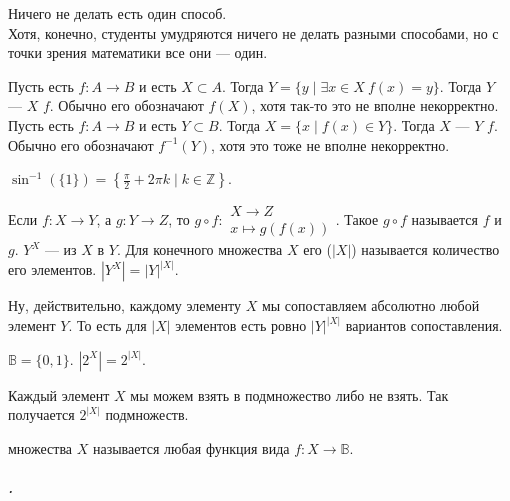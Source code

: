 \documentclass{article}
\begin{document}
\begin{itemize}
        \begin{Comment}
            Ничего не делать есть один способ.\\
            Хотя, конечно, студенты умудряются ничего не делать разными способами, но с точки зрения математики все они --- один.
        \end{Comment}
        \dfn Пусть есть $f\colon A\to B$ и есть $X\subset A$. Тогда $Y=\{y\mid \exists x\in X~f(x)=y\}$. Тогда $Y$ ---  $X$  $f$. Обычно его обозначают $f(X)$, хотя так-то это не вполне некорректно.
        \dfn Пусть есть $f\colon A\to B$ и есть $Y\subset B$. Тогда $X=\{x\mid f(x)\in Y\}$. Тогда $X$ ---  $Y$  $f$. Обычно его обозначают $f^{-1}(Y)$, хотя это тоже не вполне некорректно.
        \begin{Example}
            $\sin^{-1}(\{1\})=\left\{\frac\pi2+2\pi k\mid k\in\mathbb Z\right\}$.
        \end{Example}
        \dfn Если $f\colon X\to Y$, а $g\colon Y\to Z$, то $g\circ f\colon\substack{X\to Z\\x\mapsto g(f(x))}$. Такое $g\circ f$ называется  $f$ и $g$.
        \dfn $Y^X$ ---  из $X$ в $Y$.
        \dfn Для конечного множества $X$ его  ($|X|$) называется количество его элементов.
        \thm $|Y^X|=|Y|^{|X|}$.
        \begin{Proof}
            Ну, действительно, каждому элементу $X$ мы сопоставляем абсолютно любой элемент $Y$. То есть для $|X|$ элементов есть ровно $|Y|^{|X|}$ вариантов сопоставления.
        \end{Proof}
        \dfn $\mathbb B=\{0,1\}$.
        \thm $|2^X|=2^{|X|}$.
        \begin{Proof}
            Каждый элемент $X$ мы можем взять в подмножество либо не взять. Так получается $2^{|X|}$ подмножеств.
        \end{Proof}
        \dfn {} множества $X$ называется любая функция вида $f\colon X\to\mathbb B$.
    \end{itemize}
    \subparagraph{.}
\end{document}
